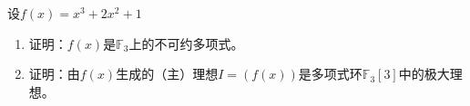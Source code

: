 设$f(x)=x^3+2x^2+1$
\begin{enumerate}
    \item 证明：$f(x)$是$\mathbb{F}_3$上的不可约多项式。
    

    \item 证明：由$f(x)$生成的（主）理想$I=(f(x))$是多项式环$\mathbb{F}_3[3]$中的极大理想。
    
\end{enumerate}